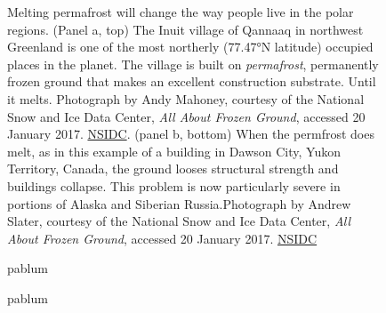 \documentclass[amstex,12pt]{book}
\begin{document}
\newpage
\begin{figure}[p]
\centering
{}


\caption{Melting permafrost will change the way people live in the polar regions. (Panel a, top) The Inuit village of Qannaaq in northwest Greenland is one of the most northerly (\ang{77.47}N latitude) occupied places in the planet. The village is built on \emph{permafrost}, permanently frozen ground that makes an excellent construction substrate. Until it melts. Photograph by Andy Mahoney, courtesy of the National Snow and Ice Data Center, \textsl{All About Frozen Ground}, accessed 20 January 2017. \href{https://nsidc.org/cryosphere/frozenground}{NSIDC}.  (panel b, bottom) When the permfrost does melt, as in this example of a building in Dawson City, Yukon Territory, Canada, the ground looses structural strength and buildings collapse. This problem is now particularly severe in portions of Alaska and Siberian Russia.Photograph by Andrew Slater, courtesy of the National Snow and Ice Data Center, \textsl{All About Frozen Ground}, accessed 20 January 2017. \href{https://nsidc.org/cryosphere/frozenground}{NSIDC}}

\label{fig:impermafrost}
\end{figure}


\newpage
\begin{figure}[p]
\centering
{}


\caption{pablum}

\label{fig:rcp_T}
\end{figure}

\newpage
\begin{figure}[p]
\centering
{}


\caption{pablum}

\label{fig:rcp_P}
\end{figure}
\end{document}
